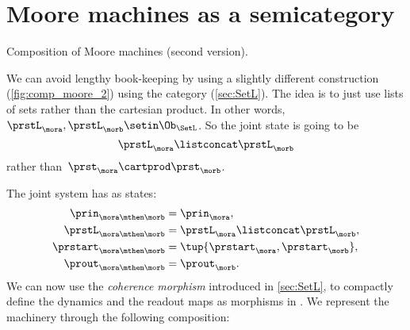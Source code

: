 
\section{Moore machines as a semicategory}
\label{sec:moore-semicategorically}

    \begin{marginfigure}
        \centering
        \caption{Composition of Moore machines (second version).}
        \label{fig:comp_moore_2}
    \end{marginfigure}

    We can avoid lengthy book-keeping by using a slightly different construction (\cref{fig:comp_moore_2}) using the \SetL category (\cref{sec:SetL}).
    The idea is to just use lists of sets rather than the cartesian product.
    In other words,~$\prstL_\mora, \prstL_\morb\setin \Ob_{\SetL}$.
    So the joint state is going to be~
    \begin{equation}
        \label{eq:moore-comp-good-joint}
        \prstL_{\mora} \listconcat   \prstL_{\morb}
    \end{equation}
    rather than~$\prst_{\mora} \cartprod \prst_{\morb}$.

    The joint system has as states:
    \begin{equation}
        \label{eq:moore-comp-good-1}
        \begin{aligned}
            \prin_{\mora\mthen\morb}    & = \prin_{\mora}, \\
            \prstL_{\mora\mthen\morb}   & = \prstL_{\mora}\listconcat  \prstL_{\morb}, \\
            \prstart_{\mora\mthen\morb} & = \tup{\prstart_{\mora},\prstart_{\morb}}, \\
            \prout_{\mora\mthen\morb}   & = \prout_{\morb}.
        \end{aligned}
    \end{equation}
    We can now use the \emph{coherence morphism} introduced in \cref{sec:SetL}, to compactly define the dynamics and the readout maps as morphisms in \Set.
    We represent the machinery through the following composition:

    \begin{widepar}
    \end{widepar}


